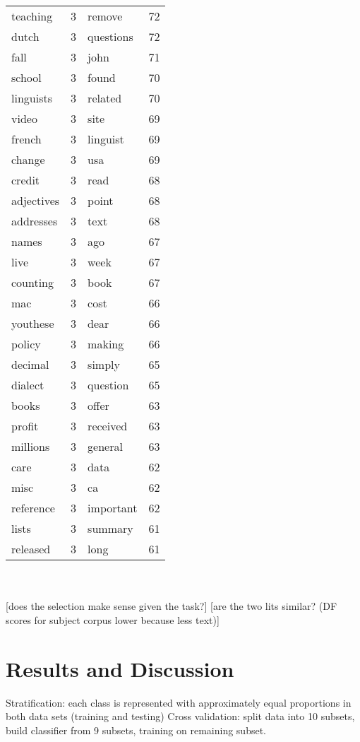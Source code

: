 \documentclass[12pt]{article}
\begin{document}
\begin{tabular}{ | l | l || l | l | }
teaching & 3 & remove & 72\\ 
dutch & 3 & questions & 72\\ 
fall & 3 & john & 71\\ 
school & 3 & found & 70\\ 
linguists & 3 & related & 70\\ 
video & 3 & site & 69\\ 
french & 3 & linguist & 69\\ 
change & 3 & usa & 69\\ 
credit & 3 & read & 68\\ 
adjectives & 3 & point & 68\\ 
addresses & 3 & text & 68\\ 
names & 3 & ago & 67\\ 
live & 3 & week & 67\\ 
counting & 3 & book & 67\\ 
mac & 3 & cost & 66\\ 
youthese & 3 & dear & 66\\ 
policy & 3 & making & 66\\ 
decimal & 3 & simply & 65\\ 
dialect & 3 & question & 65\\ 
books & 3 & offer & 63\\ 
profit & 3 & received & 63\\ 
millions & 3 & general & 63\\ 
care & 3 & data & 62\\ 
misc & 3 & ca & 62\\ 
reference & 3 & important & 62\\ 
lists & 3 & summary & 61\\ 
released & 3 & long & 61\\
\end{tabular} \\\\

[does the selection make sense given the task?]
[are the two lits similar? (DF scores for subject corpus lower because less text)]

\section{Results and Discussion}
Stratification: each class is represented with approximately equal proportions in both data sets (training and testing)
Cross validation: split data into 10 subsets, build classifier from 9 subsets, training on remaining subset.
\end{document}
